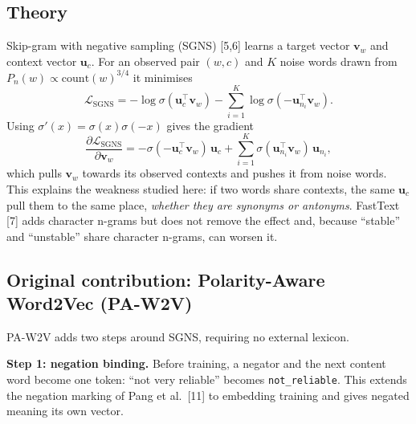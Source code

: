 \documentclass[11pt,a4paper]{article}
\begin{document}
\subsection{Theory}
Skip-gram with negative sampling (SGNS) [5,6] learns a target vector $\mathbf{v}_w$ and context vector $\mathbf{u}_c$. For an observed pair $(w,c)$ and $K$ noise words drawn from $P_n(w)\propto \mathrm{count}(w)^{3/4}$ it minimises
\begin{equation}
\mathcal{L}_{\mathrm{SGNS}}=-\log\sigma(\mathbf{u}_c^\top\mathbf{v}_w)-\sum_{i=1}^{K}\log\sigma(-\mathbf{u}_{n_i}^\top\mathbf{v}_w).
\end{equation}
Using $\sigma'(x)=\sigma(x)\sigma(-x)$ gives the gradient
\begin{equation}
\frac{\partial\mathcal{L}_{\mathrm{SGNS}}}{\partial\mathbf{v}_w}=-\sigma(-\mathbf{u}_c^\top\mathbf{v}_w)\,\mathbf{u}_c+\sum_{i=1}^{K}\sigma(\mathbf{u}_{n_i}^\top\mathbf{v}_w)\,\mathbf{u}_{n_i},
\end{equation}
which pulls $\mathbf{v}_w$ towards its observed contexts and pushes it from noise words. This explains the weakness studied here: if two words share contexts, the same $\mathbf{u}_c$ pull them to the same place, \emph{whether they are synonyms or antonyms}. FastText [7] adds character n-grams but does not remove the effect and, because ``stable'' and ``unstable'' share character n-grams, can worsen it.

\subsection{Original contribution: Polarity-Aware Word2Vec (PA-W2V)}
PA-W2V adds two steps around SGNS, requiring no external lexicon.

\textbf{Step 1: negation binding.} Before training, a negator and the next content word become one token: ``not very reliable'' becomes \texttt{not\_reliable}. This extends the negation marking of Pang et al.\ [11] to embedding training and gives negated meaning its own vector.
\end{document}
